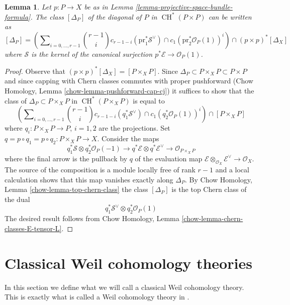 \documentclass{stacks-project}
\theoremstyle{plain}
\newtheorem{lemma}[subsection]{Lemma}
\theoremstyle{definition}
\theoremstyle{remark}
\numberwithin{equation}{subsection}
\def\CH{\mathop{\mathrm{CH}}\nolimits}
\begin{document}
\begin{lemma}
\label{lemma-diagonal-projective-bundle}
Let $p : P \to X$ be as in Lemma \ref{lemma-projective-space-bundle-formula}.
The class $[\Delta_P]$ of the diagonal of $P$ in $\CH^*(P \times P)$
can be written
as
$$
[\Delta_P] =
\left(\sum\nolimits_{i = 0, \ldots, r - 1}
{r - 1 \choose i} c_{r - 1 - i}(\text{pr}_1^*\mathcal{S}^\vee) \cap
c_1(\text{pr}_2^*\mathcal{O}_P(1))^i\right)
\cap
(p \times p)^*[\Delta_X]
$$
where $\mathcal{S}$ is the kernel of the canonical surjection
$p^*\mathcal{E} \to \mathcal{O}_P(1)$.
\end{lemma}

\begin{proof}
Observe that $(p \times p)^*[\Delta_X] = [P \times_X P]$.
Since $\Delta_P \subset P \times_X P \subset P \times P$
and since capping with Chern classes commutes with proper pushforward
(Chow Homology, Lemma \ref{chow-lemma-pushforward-cap-cj})
it suffices to show that the class of
$\Delta_P \subset P \times_X P$ in $\CH^*(P \times_X P)$
is equal to
$$
\left(\sum\nolimits_{i = 0, \ldots, r - 1}
{r - 1 \choose i} c_{r - 1 - i}(q_1^*\mathcal{S}^\vee) \cap
c_1(q_2^*\mathcal{O}_P(1))^i\right)
\cap
[P \times_X P]
$$
where $q_i : P \times_X P \to P$, $i = 1, 2$ are the projections.
Set $q = p \circ q_1 = p \circ q_2 : P \times_X P \to X$.
Consider the maps
$$
q_1^*\mathcal{S} \otimes q_2^*\mathcal{O}_P(-1) \to
q^*\mathcal{E} \otimes q^*\mathcal{E}^\vee \to
\mathcal{O}_{P \times_X P}
$$
where the final arrow is the pullback by $q$ of the evaluation map
$\mathcal{E} \otimes_{\mathcal{O}_X} \mathcal{E}^\vee \to \mathcal{O}_X$.
The source of the composition is a module locally free of rank $r - 1$
and a local calculation shows that this map vanishes exactly along
$\Delta_P$. By Chow Homology, Lemma \ref{chow-lemma-top-chern-class}
the class $[\Delta_P]$ is the top Chern class of the dual
$$
q_1^*\mathcal{S}^\vee \otimes q_2^*\mathcal{O}_P(1)
$$
The desired result follows from Chow Homology, Lemma
\ref{chow-lemma-chern-classes-E-tensor-L}.
\end{proof}








\section{Classical Weil cohomology theories}
\label{section-axioms-classical}

\noindent
In this section we define what we will call a classical Weil cohomology
theory. This is exactly what is called a Weil cohomology theory in
\cite[Section 1.2]{Kleiman-cycles}.
\end{document}
